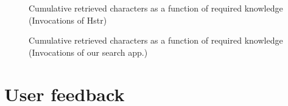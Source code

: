\begin{figure}[h!]
\centering
{}
\caption{Cumulative retrieved characters as a function of required knowledge (Invocations of Hstr)}
\label{eval-metrics-plot-chars-hstr}
\end{figure}

\begin{figure}[h!]
\centering
{}
\caption{Cumulative retrieved characters as a function of required knowledge (Invocations of our search app.)}
\label{eval-metrics-plot-chars-resh}
\end{figure}


\clearpage
\section{User feedback}

